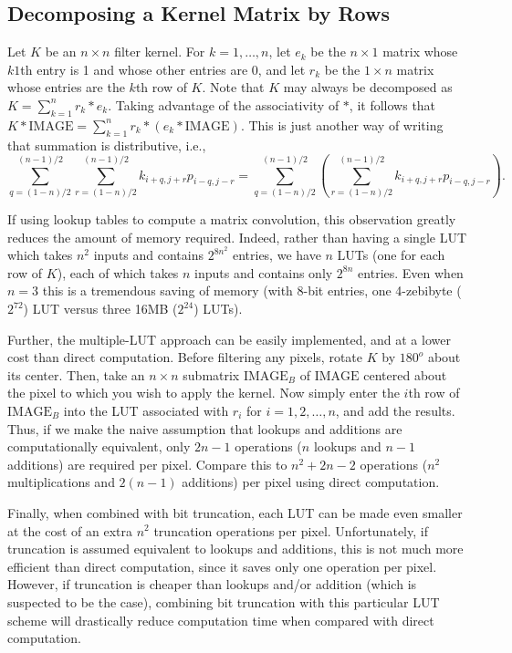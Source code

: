 \documentclass[12pt]{amsart}
\theoremstyle{definition}
\theoremstyle{remark}
\numberwithin{thm}{section}
\newcommand{\mario}[1]{\todo[color=red,inline]{mario: #1}}
\begin{document}

\subsection{Decomposing a Kernel Matrix by Rows}
Let $K$ be an $n\times n$ filter kernel. For $k=1,\ldots,n$, let $e_k$ be the $n\times 1$ matrix whose $k1$th entry is 1 and whose other entries are 0, and let $r_k$ be the $1\times n$ matrix whose entries are the $k$th row of $K$. Note that $K$ may always be decomposed as $K = \sum_{k=1}^nr_k * e_k$. Taking advantage of the associativity of $*$, it follows that $K * \text{IMAGE} = \sum_{k=1}^nr_k * \left(e_k * \text{IMAGE}\right)$. This is just another way of writing that summation is distributive, i.e.,
\[\sum_{q = (1-n)/2}^{(n-1)/2}\sum_{r = (1-n)/2}^{(n-1)/2}k_{i+q,j+r}p_{i-q,j-r} = \sum_{q = (1-n)/2}^{(n-1)/2}\left(\sum_{r = (1-n)/2}^{(n-1)/2}k_{i+q,j+r}p_{i-q,j-r}\right).\]

If using lookup tables to compute a matrix convolution, this observation greatly reduces the amount of memory required. Indeed, rather than having a single LUT which takes $n^2$ inputs and contains $2^{8n^2}$ entries, we have $n$ LUTs (one for each row of $K$), each of which takes $n$ inputs and contains only $2^{8n}$ entries. Even when $n=3$ this is a tremendous saving of memory (with 8-bit entries, one 4-zebibyte ($2^{72}$) LUT versus three 16MB ($2^{24}$) LUTs).

Further, the multiple-LUT approach can be easily implemented, and at a lower cost than direct computation. Before filtering any pixels, rotate $K$ by $180^o$ about its center. Then, take an $n\times n$ submatrix $\text{IMAGE}_B$ of $\text{IMAGE}$ centered about the pixel to which you wish to apply the kernel. Now simply enter the $i$th row of $\text{IMAGE}_B$ into the LUT associated with $r_i$ for $i = 1,2,\ldots,n$, and add the results. Thus, if we make the naive assumption that lookups and additions are computationally equivalent, only $2n-1$ operations ($n$ lookups and $n-1$ additions) are required per pixel. Compare this to $n^2+2n-2$ operations ($n^2$ multiplications and $2(n-1)$ additions) per pixel using direct computation.

Finally, when combined with bit truncation, each LUT can be made even smaller at the cost of an extra $n^2$ truncation operations per pixel. Unfortunately, if truncation is assumed equivalent to lookups and additions, this is not much more efficient than direct computation, since it saves only one operation per pixel. However, if truncation is cheaper than lookups and/or addition (which is suspected to be the case), combining bit truncation with this particular LUT scheme will drastically reduce computation time when compared with direct computation.
\end{document}
